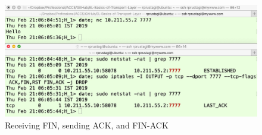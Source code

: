 \begin{figure}[!htb]
\centering
\includegraphics[scale=.22]{src/Figures/chap3/10.jpg}
\caption{Receiving FIN, sending ACK, and FIN-ACK}\label{chap3-fig10}
\end{figure}

